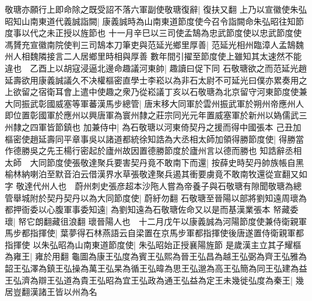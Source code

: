 敬瑭亦願行上即命除之既受詔不落六軍副使敬瑭復辭|{
	復扶又翻}
上乃以宣徽使朱弘昭知山南東道代義誠詣闕|{
	康義誠時為山南東道節度使今召令詣闕命朱弘昭往知節度事以代之未正授以旌節也}
十一月辛巳以三司使孟鵠為忠武節度使以忠武節度使馮贇充宣徽南院使判三司鵠本刀筆吏與范延光鄉里厚善|{
	范延光相州臨漳人孟鵠魏州人相魏隣接言二人居鄉里時相與厚善}
數年間引擢至節度使上雖知其太速然不能違也　乙酉上以胡寇浸逼北邊命趣議河東帥|{
	趣讀曰促下同}
石敬瑭欲之而范延光趙延壽欲用康義誠議久不决權樞密直學士李崧以為非石太尉不可延光曰僕亦累奏用之上欲留之宿衛耳會上遣中使趣之衆乃從崧議丁亥以石敬瑭為北京留守河東節度使兼大同振武彰國威塞等軍蕃漢馬步總管|{
	唐末移大同軍於雲州振武軍於朔州帝應州人即位置彰國軍於應州以興唐軍為寰州隸之莊宗同光元年置威塞軍於新州以媯儒武三州隸之四軍皆節鎮也}
加兼侍中|{
	為石敬瑭以河東倚契丹之援而得中國張本}
己丑加樞密使趙延壽同平章事吳以諸道都統徐知誥為大丞相太師加領得勝節度使|{
	得勝當作德勝吳之先王楊行密起於廬州故因置德勝節度於廬州言以德而勝也}
知誥辭丞相太師　大同節度使張敬達聚兵要害契丹竟不敢南下而還|{
	按薛史時契丹帥族帳自黑榆林納喇泊至默音泊云借漢界水草張敬達聚兵遏其衝要虜竟不敢南牧還從宣翻又如字}
敬達代州人也　蔚州刺史張彦超本沙陁人嘗為帝養子與石敬瑭有隙聞敬瑭為總管舉城附於契丹契丹以為大同節度使|{
	蔚紆勿翻}
石敬瑭至晉陽以部將劉知遠周瓌為都押衙委以心腹軍事委知遠|{
	為劉知遠為石敬瑭佐命又以是而基漢業張本}
帑藏委瓌|{
	帑它朗翻藏徂浪翻}
瓌晉陽人也　十二月戊午以康義誠為河陽節度使兼侍衛親軍馬步都指揮使|{
	葉夢得石林燕語云自梁置在京馬步軍都指揮使後唐遂置侍衛親軍都指揮使}
以朱弘昭為山南東道節度使|{
	朱弘昭始正授襄陽旌節}
是歲漢主立其子耀樞為雍王|{
	雍於用翻}
龜圖為康王弘度為賓王弘熙為晉王弘昌為越王弘弼為齊王弘雅為韶王弘澤為鎮王弘操為萬王弘杲為循王弘暐為思王弘邈為高王弘簡為同王弘建為益王弘濟為辯王弘道為貴王弘昭為宜王弘政為通王弘益為定王未幾徙弘度為秦王|{
	幾居豈翻漢諸王皆以州為名}


